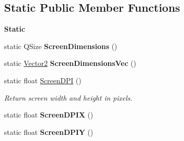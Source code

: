 \subsection*{Static Public Member Functions}
\begin{Indent}\textbf{ Static}\par
\begin{DoxyCompactItemize}
\item 
\mbox{\label{classrev_1_1_viewport_a0eaa6b946c0614c7e5ed0e579eb7edfb}} 
static Q\+Size {\bfseries Screen\+Dimensions} ()
\item 
\mbox{\label{classrev_1_1_viewport_a00f71d5cdcee7cbf8dd28073b8b53337}} 
static \mbox{\hyperlink{classrev_1_1_vector}{Vector2}} {\bfseries Screen\+Dimensions\+Vec} ()
\item 
\mbox{\label{classrev_1_1_viewport_add59faf6443b88b2876baf379f2fd3ea}} 
static float \mbox{\hyperlink{classrev_1_1_viewport_add59faf6443b88b2876baf379f2fd3ea}{Screen\+D\+PI}} ()
\begin{DoxyCompactList}\small\item\em Return screen width and height in pixels. \end{DoxyCompactList}\item 
\mbox{\label{classrev_1_1_viewport_ab1a8ea23ee407757a966eec57c368706}} 
static float {\bfseries Screen\+D\+P\+IX} ()
\item 
\mbox{\label{classrev_1_1_viewport_a948b6889aae2a961c765cfc7519fe5a7}} 
static float {\bfseries Screen\+D\+P\+IY} ()
\end{DoxyCompactItemize}
\end{Indent}
